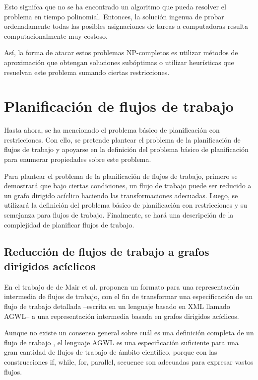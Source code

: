 Esto signifca que no se ha encontrado un algoritmo que pueda resolver el problema en tiempo polinomial. Entonces, la solución ingenua de probar ordenadamente todas las posibles asignaciones de tareas a computadoras resulta computacionalmente muy costoso.

Así, la forma de atacar estos problemas NP-completos es utilizar métodos de aproximación \cite{leiserson2001introduction} que obtengan soluciones subóptimas o utilizar heurísticas que resuelvan este problema sumando ciertas restricciones.

\section{Planificación de flujos de trabajo}
Hasta ahora, se ha mencionado el problema básico de planificación con restricciones. Con ello, se pretende plantear el problema de la planificación de flujos de trabajo y apoyarse en la definición del problema básico de planificación para enumerar propiedades sobre este problema.

Para plantear el problema de la planificación de flujos de trabajo, primero se demostrará que bajo ciertas condiciones, un flujo de trabajo puede ser reducido a un grafo dirigido acíclico haciendo las transformaciones adecuadas. Luego, se utilizará la definición del problema básico de planificación con restricciones y su semejanza para flujos de trabajo. Finalmente, se hará una descripción de la complejidad de planificar flujos de trabajo.
\subsection{Reducción de flujos de trabajo a grafos dirigidos acíclicos}
En el trabajo de de Mair et al. \cite{mair2007workflow} proponen un formato para una representación intermedia de flujos de trabajo, con el fin de transformar una especificación de un flujo de trabajo detallada --escrita en un lenguaje basado en XML llamado AGWL-- a una representación intermedia basada en grafos dirigidos acíclicos.

Aunque no existe un consenso general sobre cuál es una definición completa de un flujo de trabajo \cite{van2003workflow}, el lenguaje AGWL es una especificación suficiente para una gran cantidad de flujos de trabajo de ámbito científico, porque con las construcciones if, while, for, parallel, secuence son adecuadas para expresar vastos flujos.

